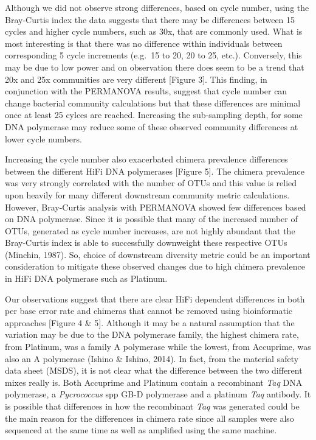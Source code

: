 \documentclass[12pt,]{article}
\begin{document}
Although we did not observe strong differences, based on cycle number,
using the Bray-Curtis index the data suggests that there may be
differences between 15 cycles and higher cycle numbers, such as 30x,
that are commonly used. What is most interesting is that there was no
difference within individuals between corresponding 5 cycle increments
(e.g.~15 to 20, 20 to 25, etc.). Conversely, this may be due to low
power and on observation there does seem to be a trend that 20x and 25x
communities are very different {[}Figure 3{]}. This finding, in
conjunction with the PERMANOVA results, suggest that cycle number can
change bacterial community calculations but that these differences are
minimal once at least 25 cylces are reached. Increasing the sub-sampling
depth, for some DNA polymerase may reduce some of these observed
community differences at lower cycle numbers.

Increasing the cycle number also exacerbated chimera prevalence
differences between the different HiFi DNA polymerases {[}Figure 5{]}.
The chimera prevalence was very strongly correlated with the number of
OTUs and this value is relied upon heavily for many different downstream
community metric calculations. However, Bray-Curtis analysis with
PERMANOVA showed few differences based on DNA polymerase. Since it is
possible that many of the increased number of OTUs, generated as cycle
number increases, are not highly abundant that the Bray-Curtis index is
able to successfully downweight these respective OTUs (Minchin, 1987).
So, choice of downstream diversity metric could be an important
consideration to mitigate these observed changes due to high chimera
prevalence in HiFi DNA polymerase such as Platinum.

Our observations suggest that there are clear HiFi dependent differences
in both per base error rate and chimeras that cannot be removed using
bioinformatic approaches {[}Figure 4 \& 5{]}. Although it may be a
natural assumption that the variation may be due to the DNA polymerase
family, the highest chimera rate, from Platinum, was a family A
polymerase while the lowest, from Accuprime, was also an A polymerase
(Ishino \& Ishino, 2014). In fact, from the material safety data sheet
(MSDS), it is not clear what the difference between the two different
mixes really is. Both Accuprime and Platinum contain a recombinant
\emph{Taq} DNA polymerase, a \emph{Pycrococcus} spp GB-D polymerase and
a platinum \emph{Taq} antibody. It is possible that differences in how
the recombinant \emph{Taq} was generated could be the main reason for
the differences in chimera rate since all samples were also sequenced at
the same time as well as amplified using the same machine.
\end{document}
